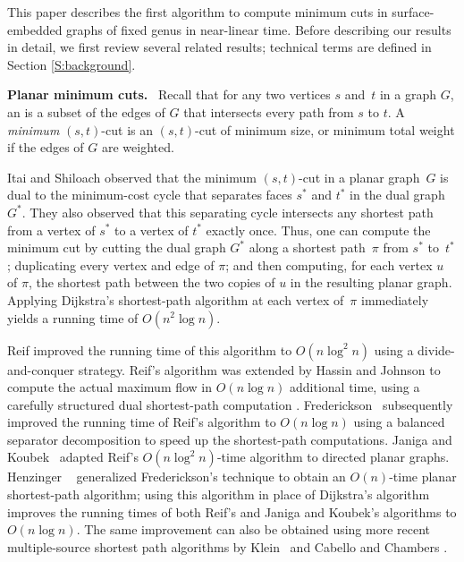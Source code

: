 \documentclass{sig-alternate}
\def\note#1{\EMPH{\color{red} #1}}
\def\fakeparagraph#1{\medskip\noindent\textbf{#1}~}
\begin{document}
This paper describes the first algorithm to compute minimum cuts in surface-embedded graphs of fixed genus in near-linear time.  Before describing our results in detail, we first review several related results; technical terms are defined in Section \ref{S:background}.

%

\fakeparagraph{Planar minimum cuts.}
Recall that for any two vertices $s$ and~$t$ in a graph $G$, an  is a subset of the edges of $G$ that intersects every path from $s$ to $t$.  A \emph{minimum} $(s,t)$-cut is an $(s,t)$-cut of minimum size, or minimum total weight if the edges of $G$ are weighted.

Itai and Shiloach \cite{is-mfpn-79} observed that the minimum $(s,t)$-cut in a planar graph~$G$ is dual to the minimum-cost cycle that separates faces $s^*$ and $t^*$ in the dual graph $G^*$.  They also observed that this separating cycle intersects any shortest path from a vertex of $s^*$ to a vertex of $t^*$ exactly once.  Thus, one can compute the minimum cut by cutting the dual graph $G^*$ along a shortest path~$\pi$ from $s^*$ to~$t^*$; duplicating every vertex and edge of $\pi$; and then computing, for each vertex $u$ of $\pi$, the shortest path between the two copies of $u$ in the resulting planar graph.  Applying Dijkstra's shortest-path algorithm at each vertex of~$\pi$ immediately yields a running time of $O(n^2\log n)$.

Reif \cite{r-mstcp-83} improved the running time of this algorithm to $O(n\log^2 n)$ using a divide-and-conquer strategy.  Reif's algorithm was extended by Hassin and Johnson to compute the actual maximum flow in $O(n\log n)$ additional time, using a carefully structured dual shortest-path computation \cite{hj-oamfu-85}.  Frederickson~\cite{f-faspp-87} subsequently improved the running time of Reif's algorithm to $O(n\log n)$ using a balanced separator decomposition to speed up the shortest-path computations.  Janiga and Koubek~\cite{jk-mcdpn-92} adapted Reif's $O(n\log^2 n)$-time algorithm to directed planar graphs.  Henzinger \etal~\cite{hkrs-fspap-97} generalized Frederickson's technique to obtain an $O(n)$-time planar shortest-path algorithm; using this algorithm in place of Dijkstra's algorithm improves the running times of both Reif's and Janiga and Koubek's algorithms to $O(n\log n)$.  The same improvement can also be obtained using more recent multiple-source shortest path algorithms by Klein~\cite{k-msspp-05} and Cabello and Chambers \cite{cc-msspg-07}.
\end{document}
